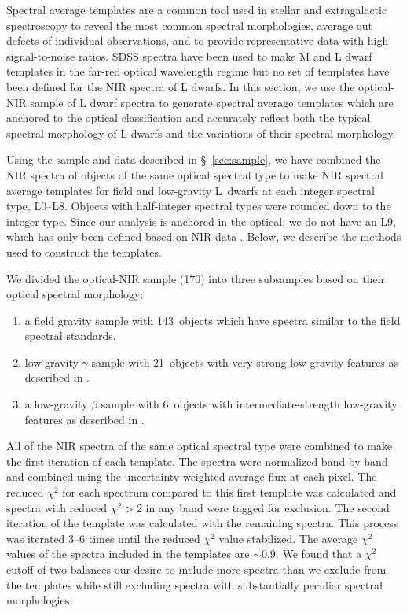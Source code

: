 \documentclass[12pt,preprint]{aastex}
\newcommand{\sample}{170}
\newcommand{\optField}{143}
\newcommand{\optBeta}{6}
\newcommand{\optGamma}{21}
\begin{document}
Spectral average templates are a common tool used in stellar and extragalactic spectroscopy to reveal the most common spectral morphologies, average out defects of individual observations, and to provide representative data with high signal-to-noise ratios.
SDSS spectra have been used to make M and L dwarf templates in the far-red optical wavelength regime \citep{Bochanski07_templates, Schmidt:2014jc} but no set of templates have been defined for the NIR spectra of L dwarfs.
In this section, we use the optical-NIR sample of L dwarf spectra to generate spectral average templates which are anchored to the optical classification and accurately reflect both the typical spectral morphology of L dwarfs and the variations of their spectral morphology.

Using the sample and data described in \S~\ref{sec:sample}, we have combined the NIR spectra of objects of the same optical spectral type to make NIR spectral average templates for field and low-gravity L~dwarfs at each integer spectral type, L0--L8. Objects with half-integer spectral types were rounded down to the integer type. 
Since our analysis is anchored in the optical, we do not have an L9, which has only been defined based on NIR data \citep{K99,Geballe02}.
Below, we describe the methods used to construct the templates.

We divided the optical-NIR sample (\sample) into three subsamples based on their optical spectral morphology: 
\begin{enumerate} \itemsep1pt \parskip0pt 
	\item a field gravity sample with \optField~objects which have spectra similar to the \citet{K99} field spectral standards.
	\item low-gravity $\gamma$ sample with \optGamma~objects with very strong low-gravity features as described in \citet{Cruz09_lowg}.
	\item a low-gravity $\beta$ sample with \optBeta~objects with intermediate-strength low-gravity features as described in \citet{Cruz09_lowg}.
\end{enumerate}

All of the NIR spectra of the same optical spectral type were combined to make the first iteration of each template.
The spectra were normalized band-by-band and combined using the uncertainty weighted average flux at each pixel.
The reduced $\chi^2$ for each spectrum compared to this first template was calculated and spectra with reduced $\chi^2 > 2$ in any band were tagged for exclusion.
The second iteration of the template was calculated with the remaining spectra.
This process was iterated 3--6 times until the reduced $\chi^2$ value stabilized.
The average $\chi^2$ values of the spectra included in the templates are $\sim0.9$.
We found that a $\chi^2$ cutoff of two balances our desire to include more spectra than we exclude from the templates while still excluding spectra with substantially peculiar spectral morphologies.
\end{document}
